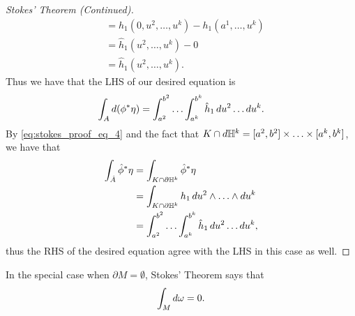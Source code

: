 \documentclass[notoc,notitlepage]{tufte-book}
\begin{document}
\begin{proof}[Stokes' Theorem (Continued)]
\begin{align*}
    &= h_1(0, u^2, \ldots, u^k) - h_1(a^1, \ldots, u^k) \\
    &= \hat{h}_1(u^2, \ldots, u^k) - 0 \\
    &= \hat{h}_1(u^2, \ldots, u^k).
  \end{align*}
  Thus we have that the LHS of our desired equation is
  \begin{equation*}
    \int_{A} \mathop{}\!d{(\phi^* \eta)} = \int_{a^2}^{b^2} \hdots \int_{a^k}^{b^k}
    \hat{h}_1 \mathop{}\!d{u^2} \hdots \mathop{}\!d{u^k}.
  \end{equation*}
  By \cref{eq:stokes_proof_eq_4} and the fact that $K \cap \mathop{}\!d{\mathbb{H}^k} =
  [a^2, b^2] \times \hdots \times [a^k, b^k]$, we have that
  \begin{align*}
    \int_{\hat{A}} \hat{\phi}^* \eta
    &= \int_{K \cap \partial \mathbb{H}^k} \hat{\phi}^* \eta \\
    &= \int_{K \cap \partial \mathbb{H}^k} h_1 \mathop{}\!d{u^2} \land \hdots \land
    \mathop{}\!d{u^k} \\
    &= \int_{a^2}^{b^2} \hdots \int_{a^k}^{b^k} \hat{h}_1 \mathop{}\!d{u^2} \hdots
    \mathop{}\!d{u^k},
  \end{align*}
  thus the RHS of the desired equation agree with the LHS in this case as well.
\end{proof}

\begin{remark}
  In the special case when $\partial M = \emptyset$, Stokes' Theorem says that
  \begin{equation*}
    \int_{M} \mathop{}\!d{\omega} = 0. 
  \end{equation*}
\end{remark}
\end{document}
